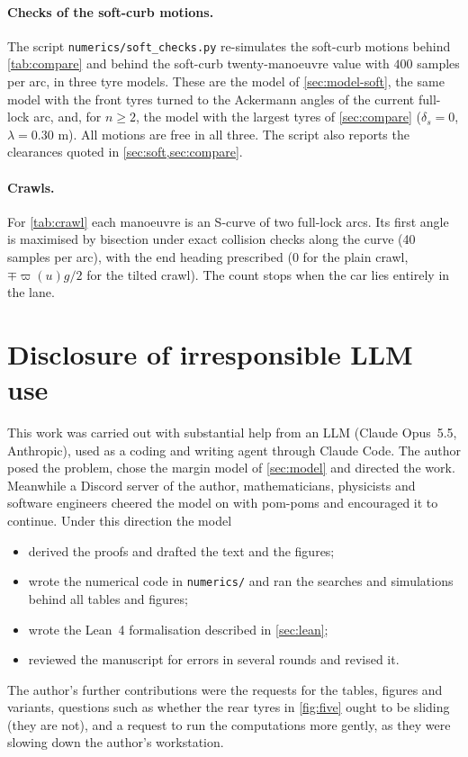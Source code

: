 \paragraph{Checks of the soft-curb motions.}
The script \texttt{numerics/soft\_checks.py} re-simulates the soft-curb motions behind \cref{tab:compare} and behind the soft-curb twenty-manoeuvre value with $400$ samples per arc, in three tyre models.
These are the model of \cref{sec:model-soft}, the same model with the front tyres turned to the Ackermann angles of the current full-lock arc, and, for $n\ge2$, the model with the largest tyres of \cref{sec:compare} ($\delta_s=0$, $\lambda=0.30$ m).
All motions are free in all three.
The script also reports the clearances quoted in \cref{sec:soft,sec:compare}.

\paragraph{Crawls.}
For \cref{tab:crawl} each manoeuvre is an S-curve of two full-lock arcs.
Its first angle is maximised by bisection under exact collision checks along the curve (40 samples per arc), with the end heading prescribed ($0$ for the plain crawl, $\mp\varpi(u)g/2$ for the tilted crawl).
The count stops when the car lies entirely in the lane.

\section{Disclosure of irresponsible LLM use}\label{app:ai}

This work was carried out with substantial help from an LLM (Claude Opus~5.5, Anthropic), used as a coding and writing agent through Claude Code.
The author posed the problem, chose the margin model of \cref{sec:model} and directed the work.
Meanwhile a Discord server of the author, mathematicians, physicists and software engineers cheered the model on with pom-poms and encouraged it to continue.
Under this direction the model
\begin{itemize}[nosep]
\item derived the proofs and drafted the text and the figures;
\item wrote the numerical code in \texttt{numerics/} and ran the searches and simulations behind all tables and figures;
\item wrote the Lean~4 formalisation described in \cref{sec:lean};
\item reviewed the manuscript for errors in several rounds and revised it.
\end{itemize}
The author's further contributions were the requests for the tables, figures and variants, questions such as whether the rear tyres in \cref{fig:five} ought to be sliding (they are not), and a request to run the computations more gently, as they were slowing down the author's workstation.


